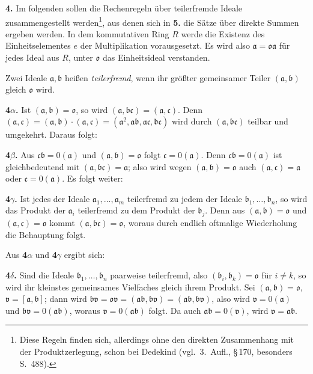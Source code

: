 \documentclass[12pt,a4paper]{article}
\theoremstyle{plain}
\theoremstyle{definition}
\theoremstyle{remark}
\begin{document}
\medskip
\noindent
\textbf{4.} Im folgenden sollen die Rechenregeln über teilerfremde Ideale zusammengestellt werden\footnote{Diese Regeln finden sich, allerdings ohne den direkten Zusammenhang mit der Produktzerlegung, schon bei Dedekind (vgl.\ 3.~Aufl., \S\,170, besonders S.~488).}, aus denen sich in \textbf{5.} die Sätze über direkte Summen ergeben werden. In dem kommutativen Ring $R$ werde die Existenz des Einheitselementes $e$ der Multiplikation vorausgesetzt. Es wird also $\mathfrak{a} = \mathfrak{o}\mathfrak{a}$ für jedes Ideal aus $R$, unter $\mathfrak{o}$ das Einheitsideal verstanden.

Zwei Ideale $\mathfrak{a}, \mathfrak{b}$ heißen \textit{teilerfremd}, wenn ihr größter gemeinsamer Teiler $(\mathfrak{a}, \mathfrak{b})$ gleich $\mathfrak{o}$ wird.

\smallskip
\noindent
\textbf{4$\alpha$.} Ist $(\mathfrak{a}, \mathfrak{b}) = \mathfrak{o}$, so wird $(\mathfrak{a}, \mathfrak{b}\mathfrak{c}) = (\mathfrak{a}, \mathfrak{c})$. Denn $(\mathfrak{a}, \mathfrak{c}) = (\mathfrak{a}, \mathfrak{b}) \cdot (\mathfrak{a}, \mathfrak{c}) = (\mathfrak{a}^{2}, \mathfrak{a}\mathfrak{b}, \mathfrak{a}\mathfrak{c}, \mathfrak{b}\mathfrak{c})$ wird durch $(\mathfrak{a}, \mathfrak{b}\mathfrak{c})$ teilbar und umgekehrt. Daraus folgt:

\smallskip
\noindent
\textbf{4$\beta$.} Aus $\mathfrak{c}\mathfrak{b} = 0(\mathfrak{a})$ und $(\mathfrak{a}, \mathfrak{b}) = \mathfrak{o}$ folgt $\mathfrak{c} = 0(\mathfrak{a})$. Denn $\mathfrak{c}\mathfrak{b} = 0(\mathfrak{a})$ ist gleichbedeutend mit $(\mathfrak{a}, \mathfrak{b}\mathfrak{c}) = \mathfrak{a}$; also wird wegen $(\mathfrak{a}, \mathfrak{b}) = \mathfrak{o}$ auch $(\mathfrak{a}, \mathfrak{c}) = \mathfrak{a}$ oder $\mathfrak{c} = 0(\mathfrak{a})$. Es folgt weiter:

\smallskip
\noindent
\textbf{4$\gamma$.} Ist jedes der Ideale $\mathfrak{a}_{1},\dots,\mathfrak{a}_{m}$ teilerfremd zu jedem der Ideale $\mathfrak{b}_{1},\dots,\mathfrak{b}_{n}$, so wird das Produkt der $\mathfrak{a}_{i}$ teilerfremd zu dem Produkt der $\mathfrak{b}_{j}$. Denn aus $(\mathfrak{a}, \mathfrak{b}) = \mathfrak{o}$ und $(\mathfrak{a}, \mathfrak{c}) = \mathfrak{o}$ kommt $(\mathfrak{a}, \mathfrak{b}\mathfrak{c}) = \mathfrak{o}$, woraus durch endlich oftmalige Wiederholung die Behauptung folgt.

Aus \textbf{4$\alpha$} und \textbf{4$\gamma$} ergibt sich:

\smallskip
\noindent
\textbf{4$\delta$.} Sind die Ideale $\mathfrak{b}_{1},\dots,\mathfrak{b}_{n}$ paarweise teilerfremd, also $(\mathfrak{b}_{i}, \mathfrak{b}_{k}) = \mathfrak{o}$ für $i \neq k$, so wird ihr kleinstes gemeinsames Vielfaches gleich ihrem Produkt. Sei $(\mathfrak{a}, \mathfrak{b}) = \mathfrak{o}$, $\mathfrak{v} = [\mathfrak{a}, \mathfrak{b}]$; dann wird $\mathfrak{b}\mathfrak{v} = \mathfrak{o}\mathfrak{v} = (\mathfrak{a}\mathfrak{b}, \mathfrak{b}\mathfrak{v}) = (\mathfrak{a}\mathfrak{b}, \mathfrak{b}\mathfrak{v})$, also wird $\mathfrak{v} = 0(\mathfrak{a})$ und $\mathfrak{b}\mathfrak{v} = 0(\mathfrak{a}\mathfrak{b})$, woraus $\mathfrak{v} = 0(\mathfrak{a}\mathfrak{b})$ folgt. Da auch $\mathfrak{a}\mathfrak{b} = 0(\mathfrak{v})$, wird $\mathfrak{v} = \mathfrak{a}\mathfrak{b}$.
\end{document}
